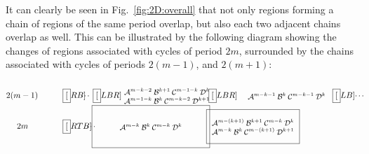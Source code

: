 \documentclass[10pt]{article}
\newcommand{\A}{{\mathcal A}}
\newcommand{\B}{{\mathcal B}}
\newcommand{\C}{{\mathcal C}}
\newcommand{\D}{{\mathcal D}}
\begin{document}
It can clearly be seen in Fig.~\ref{fig:2D:overall} that not only
regions forming a chain of regions of the same period overlap, but
also each two adjacent chains overlap as well.  This can be
illustrated by the following diagram showing the changes of regions
associated with cycles of period $2m$, surrounded by the chains
associated with cycles of periods $2(m-1)$, and $2(m+1)$:
\begin{equation*}
	\begin{split}
		2(m-1)\hspace*{3em}
		&
		\fbox[RB]{
			\begin{minipage}[c][4.5em][c]{3ex}\small
				\hspace*{-.7em}\dots
			\end{minipage}
		}\hspace*{-1ex}
		\fbox[LBR]{
			\begin{minipage}[c][3.5em][c]{11em}\small\centering
				$\A^{m-k-2}\:\B^{k+1}\:\C^{m-1-k}    \:\D^{k}$\\
				$\A^{m-1-k}   \:\B^{k}  \:\C^{m-k-2}\:\D^{k+1}$
			\end{minipage}
		}\hspace*{-1ex}
		\fbox[LBR]{
			\begin{minipage}[c][4.5em][c]{12em}\small\centering
				$\A^{m-k-1}\:\B^k\:\C^{m-k-1}\:\D^k$
			\end{minipage}
		}
		\hspace*{-1ex}
		\fbox[LB]{
			\begin{minipage}[c][3.5em][c]{1ex}\small
				\dots
			\end{minipage}
		}\\[-1.5em]
		2m\hspace*{4.2em}
		&
		\fbox[RTB]{
			\begin{minipage}[c][3.5em][c]{1ex}\small
				\hspace*{-.7em}\dots
			\end{minipage}
		}
		\hspace*{-1ex}
		\fbox{
			\begin{minipage}[c][4.5em][c]{13em}\small\centering
				$\A^{m-k}\:\B^k\:\C^{m-k}\:\D^k$
			\end{minipage}
		}
		\hspace*{-1ex}
		\fbox{
			\begin{minipage}[c][3.5em][c]{10em}\small\centering
				$\A^{m-(k+1)}\:\B^{k+1}\:\C^{m-k}    \:\D^{k}$\\
				$\A^{m-k}   \:\B^{k}  \:\C^{m-(k+1)}\:\D^{k+1}$
			\end{minipage}
}
\end{split}
\end{equation*}
\end{document}
